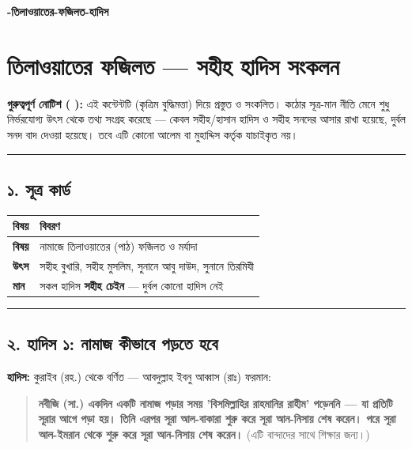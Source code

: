 

\begin{center}{\Large\bfseries\color{emerald} -তিলাওয়াতের-ফজিলত-হাদিস}\end{center}
\vspace{1em}
\section*{তিলাওয়াতের ফজিলত — সহীহ হাদিস সংকলন}

\begin{warnbox}
 \textbf{গুরুত্বপূর্ণ নোটিশ ( ):} এই কন্টেন্টটি  (কৃত্রিম বুদ্ধিমত্তা) দিয়ে প্রস্তুত ও সংকলিত।  কঠোর সূত্র-মান নীতি মেনে শুধু নির্ভরযোগ্য উৎস থেকে তথ্য সংগ্রহ করেছে — কেবল সহীহ/হাসান হাদিস ও সহীহ সনদের আসার রাখা হয়েছে, দুর্বল সনদ বাদ দেওয়া হয়েছে। তবে এটি কোনো আলেম বা মুহাদ্দিস কর্তৃক যাচাইকৃত নয়।
\end{warnbox}

\medskip\hrule\medskip

\subsection*{১. সূত্র কার্ড}

\begin{table}[h]\centering\small
\begin{tabular}{ll}
বিষয় & বিবরণ \\
\hline
\textbf{বিষয়} & নামাজে তিলাওয়াতের (পাঠ) ফজিলত ও মর্যাদা \\
\textbf{উৎস} & সহীহ বুখারি, সহীহ মুসলিম, সুনানে আবু দাউদ, সুনানে তিরমিযী \\
\textbf{মান} & সকল হাদিস \textbf{সহীহ চেইন} — দুর্বল কোনো হাদিস নেই \\
\hline
\end{tabular}
\end{table}

\medskip\hrule\medskip

\subsection*{২. হাদিস ১: নামাজ কীভাবে পড়তে হবে}

\textbf{হাদিস:} কুরাইব (রহ.) থেকে বর্ণিত — আবদুল্লাহ ইবনু আব্বাস (রাঃ) ফরমান:

\begin{quote}
\textbf{নবীজি (সা.) একদিন একটি নামাজ পড়ার সময় 'বিসমিল্লাহির রাহমানির রাহীম' পড়েননি — যা প্রতিটি সূরার আগে পড়া হয়। তিনি এরপর সূরা আল-বাকারা শুরু করে সূরা আন-নিসায় শেষ করেন। পরে সূরা আল-ইমরান থেকে শুরু করে সূরা আন-নিসায় শেষ করেন।} (এটি বান্দাদের সাথে শিক্ষার জন্য।)
\end{quote}


